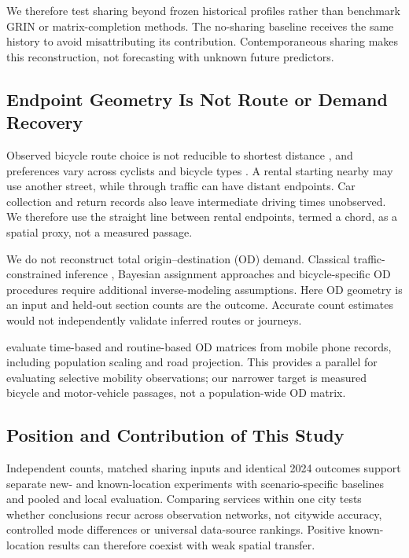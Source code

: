 \documentclass[]{interact}
\begin{document}
We therefore test sharing beyond frozen historical profiles rather than benchmark GRIN or matrix-completion methods. The no-sharing baseline receives the same history to avoid misattributing its contribution. Contemporaneous sharing makes this reconstruction, not forecasting with unknown future predictors.

\subsection{Endpoint Geometry Is Not Route or Demand Recovery}
Observed bicycle route choice is not reducible to shortest distance \citep{broach2012}, and preferences vary across cyclists and bicycle types \citep{lilas2025}. A rental starting nearby may use another street, while through traffic can have distant endpoints. Car collection and return records also leave intermediate driving times unobserved. We therefore use the straight line between rental endpoints, termed a chord, as a spatial proxy, not a measured passage.

We do not reconstruct total origin--destination (OD) demand. Classical traffic-constrained inference \citep{vanzuylen1980,cascetta1984}, Bayesian assignment approaches \citep{hazelton2024} and bicycle-specific OD procedures \citep{ryu2020,melo2023} require additional inverse-modeling assumptions. Here OD geometry is an input and held-out section counts are the outcome. Accurate count estimates would not independently validate inferred routes or journeys.

\citet{mamei2019od} evaluate time-based and routine-based OD matrices from mobile phone records, including population scaling and road projection. This provides a parallel for evaluating selective mobility observations; our narrower target is measured bicycle and motor-vehicle passages, not a population-wide OD matrix.

\subsection{Position and Contribution of This Study}
Independent counts, matched sharing inputs and identical 2024 outcomes support separate new- and known-location experiments with scenario-specific baselines and pooled and local evaluation. Comparing services within one city tests whether conclusions recur across observation networks, not citywide accuracy, controlled mode differences or universal data-source rankings. Positive known-location results can therefore coexist with weak spatial transfer.
\end{document}
